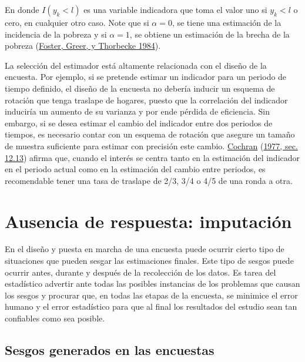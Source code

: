 \documentclass[
  12pt,
  spanish,
]{book}
\begin{document}
En donde \(I(y_k<l)\) es una variable indicadora que toma el valor uno si \(y_k<l\) o cero, en cualquier otro caso. Note que si \(\alpha = 0\), se tiene una estimación de la incidencia de la pobreza y si \(\alpha = 1\), se obtiene un estimación de la brecha de la pobreza (\protect\hyperlink{ref-Foster_Greer_Thorbecke_1984}{Foster, Greer, y Thorbecke 1984}).

La selección del estimador está altamente relacionada con el diseño de la encuesta. Por ejemplo, si se pretende estimar un indicador para un periodo de tiempo definido, el diseño de la encuesta no debería inducir un esquema de rotación que tenga traslape de hogares, puesto que la correlación del indicador induciría un aumento de su varianza y por ende pérdida de eficiencia. Sin embargo, si se desea estimar el cambio del indicador entre dos periodos de tiempos, es necesario contar con un esquema de rotación que asegure un tamaño de muestra suficiente para estimar con precisión este cambio. \protect\hyperlink{ref-Cochran_1977}{Cochran} (\protect\hyperlink{ref-Cochran_1977}{1977, sec. 12.13}) afirma que, cuando el interés se centra tanto en la estimación del indicador en el periodo actual como en la estimación del cambio entre periodos, es recomendable tener una tasa de traslape de 2/3, 3/4 o 4/5 de una ronda a otra.

\hypertarget{ausencia-de-respuesta-imputaciuxf3n}{%
\chapter{Ausencia de respuesta: imputación}\label{ausencia-de-respuesta-imputaciuxf3n}}

En el diseño y puesta en marcha de una encuesta puede ocurrir cierto tipo de situaciones que pueden sesgar las estimaciones finales. Este tipo de sesgos puede ocurrir antes, durante y después de la recolección de los datos. Es tarea del estadístico advertir ante todas las posibles instancias de los problemas que causan los sesgos y procurar que, en todas las etapas de la encuesta, se minimice el error humano y el error estadístico para que al final los resultados del estudio sean tan confiables como sea posible.

\hypertarget{sesgos-generados-en-las-encuestas}{%
\section{Sesgos generados en las encuestas}\label{sesgos-generados-en-las-encuestas}}
\end{document}
